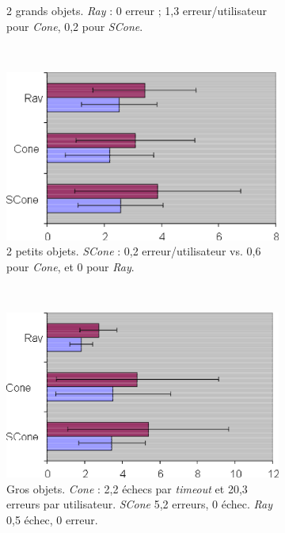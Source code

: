 \begin{figure}[!htbp]
\begin{subfigure}[t]{\subImgWmo}
			\caption{2 grands objets. \emph{Ray} : 0 erreur ; 1,3 erreur/utilisateur pour \emph{Cone}, 0,2 pour \emph{SCone}.}
			\label{fig:shadowPLarge}
		\end{subfigure}
		~
		\begin{subfigure}[t]{\subImgWmo}
			\centering
			\includegraphics[width=\textwidth]{figures/ch2/shadowPSmall}
			\caption{2 petits objets. \emph{SCone} : 0,2 erreur/utilisateur vs. 0,6 pour \emph{Cone}, et 0 pour \emph{Ray}.}
			\label{fig:shadowPSmall}
		\end{subfigure}
		~
		\begin{subfigure}[t]{\subImgWmo}
			\centering
			\includegraphics[width=\textwidth]{figures/ch2/shadowCLarge}
			\caption{Gros objets. \emph{Cone} : 2,2 échecs par \emph{timeout} et 20,3 erreurs par utilisateur. \emph{SCone} 5,2 erreurs, 0 échec. \emph{Ray} 0,5 échec, 0 erreur.}
			\label{fig:shadowCLarge}
		\end{subfigure}
		~
		\begin{subfigure}[t]{\subImgWmo}

\end{subfigure}
\end{figure}
